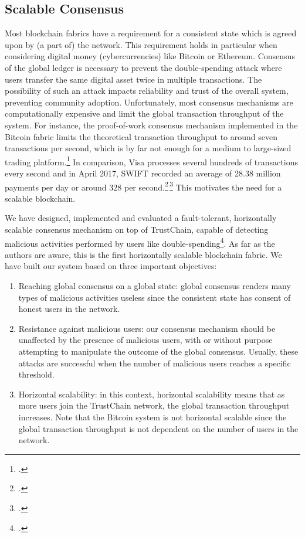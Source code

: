 \documentclass[USenglish]{article}
\begin{document}
\subsection{Scalable Consensus}
\label{sec:scalable_consensus}
Most blockchain fabrics have a requirement for a consistent state which is agreed upon by (a part of) the network.
This requirement holds in particular when considering digital money (cybercurrencies) like Bitcoin or Ethereum.
Consensus of the global ledger is necessary to prevent the double-spending attack where users transfer the same digital asset twice in multiple transactions.
The possibility of such an attack impacts reliability and trust of the overall system, preventing community adoption.
Unfortunately, most consensus mechanisms are computationally expensive and limit the global transaction throughput of the system.
For instance, the proof-of-work consensus mechanism implemented in the Bitcoin fabric limits the theoretical transaction throughput to around seven transactions per second, which is by far not enough for a medium to large-sized trading platform.\footcite{duebitcoinscale}
In comparison, Visa processes several hundreds of transactions every second and in April 2017, SWIFT recorded an average of 28.38 million payments per day or around 328 per second.\footcite{visatransactions}\,\footcite{swifttransactions}
This motivates the need for a scalable blockchain.

We have designed, implemented and evaluated a fault-tolerant, horizontally scalable consensus mechanism on top of TrustChain, capable of detecting malicious activities performed by users like double-spending\footcite{ren2017implicit}.
As far as the authors are aware, this is the first horizontally scalable blockchain fabric.
We have built our system based on three important objectives:
\begin{enumerate}
	\item Reaching global consensus on a global state: global consensus renders many types of malicious activities useless since the consistent state has consent of honest users in the network.
	\item Resistance against malicious users: our consensus mechanism should be unaffected by the presence of malicious users, with or without purpose attempting to manipulate the outcome of the global consensus. Usually, these attacks are successful when the number of malicious users reaches a specific threshold.
	\item Horizontal scalability: in this context, horizontal scalability means that as more users join the TrustChain network, the global transaction throughput increases. Note that the Bitcoin system is not horizontal scalable since the global transaction throughput is not dependent on the number of users in the network.
\end{enumerate}
\end{document}
